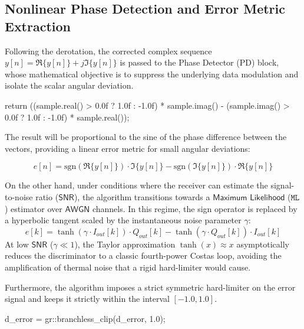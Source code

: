 \subsection{Nonlinear Phase Detection and Error Metric Extraction} \label{subsec:phase_detection}
Following the derotation, the corrected complex sequence $y[n] = \Re\{y[n]\} + j\Im\{y[n]\}$ is passed to the Phase Detector (PD) block, whose mathematical objective is to suppress the underlying data modulation and isolate the scalar angular deviation.
\begin{cpp}
return ((sample.real() > 0.0f ? 1.0f : -1.0f) * sample.imag() -
        (sample.imag() > 0.0f ? 1.0f : -1.0f) * sample.real());
\end{cpp} \vspace{-2.25mm}

The result will be proportional to the sine of the phase difference between the vectors, providing a linear error metric for small angular deviations:

\begin{equation} \label{eq:error_metric}
    e[n] = \text{sgn}(\Re\{y[n]\}) \cdot \Im\{y[n]\} - \text{sgn}(\Im\{y[n]\}) \cdot \Re\{y[n]\}
\end{equation}

On the other hand, under conditions where the receiver can estimate the signal-to-noise ratio (\(\mathsf{SNR}\)), the algorithm transitions towards a $\mathsf{Maximum}$ $\mathsf{Likelihood}$ (\(\mathtt{ML}\)) estimator over $\mathsf{AWGN}$ channels. In this regime, the sign operator is replaced by a hyperbolic tangent scaled by the instantaneous noise parameter $\gamma$:
\begin{equation} \label{eq:ml_estimator}
    e[k] = \tanh(\gamma \cdot I_{out}[k]) \cdot Q_{out}[k] - \tanh(\gamma \cdot Q_{out}[k]) \cdot I_{out}[k]
\end{equation}
At low \(\mathsf{SNR}\) ($\gamma \ll 1$), the Taylor approximation $\tanh(x) \approx x$ asymptotically reduces the discriminator to a classic fourth-power Costas loop, avoiding the amplification of thermal noise that a rigid hard-limiter would cause.

Furthermore, the algorithm imposes a strict symmetric hard-limiter on the error signal and keeps it strictly within the interval $[-1.0, 1.0]$.
\begin{cpp}
    d_error = gr::branchless_clip(d_error, 1.0);
\end{cpp}\vspace{-2.25mm}

